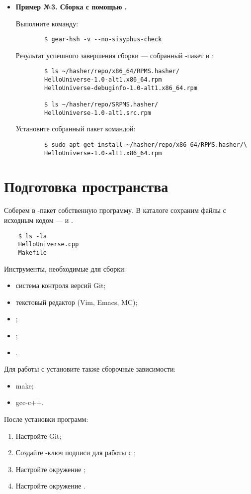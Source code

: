\begin{itemize}
	\item \textbf{Пример №3. Сборка с помощью .}
	
	Выполните команду: 
	\begin{verbatim}
		$ gear-hsh -v --no-sisyphus-check 
	\end{verbatim}
	
	Результат успешного завершения сборки --- собранный -пакет и :
	\begin{verbatim}
		$ ls ~/hasher/repo/x86_64/RPMS.hasher/
		HelloUniverse-1.0-alt1.x86_64.rpm
		HelloUniverse-debuginfo-1.0-alt1.x86_64.rpm
		
		$ ls ~/hasher/repo/SRPMS.hasher/
		HelloUniverse-1.0-alt1.src.rpm
	\end{verbatim} 
	
	Установите собранный пакет командой: 
	\begin{verbatim}
		$ sudo apt-get install ~/hasher/repo/x86_64/RPMS.hasher/\
		HelloUniverse-1.0-alt1.x86_64.rpm
	\end{verbatim}
\end{itemize} 


\section{Подготовка пространства}
Соберем в -пакет собственную программу. В каталоге сохраним файлы с исходным кодом ---  и .
\begin{verbatim}
	$ ls -la
	HelloUniverse.cpp
	Makefile
\end{verbatim}


Инструменты, необходимые для сборки: 
\begin{itemize}
	\item система контроля версий Git;
	\item текстовый редактор (Vim, Emacs, MC);
	\item {};
	\item {};
	\item {}.
\end{itemize}

Для работы с  установите также сборочные зависимости:
\begin{itemize}
	\item make;
	\item gcc-c++.
\end{itemize} 

После установки программ: 
\begin{enumerate}
	\item Настройте Git;
	\item Создайте -ключ подписи для работы с ;
	\item Настройте окружение ;
	\item Настройте окружение .
\end{enumerate}